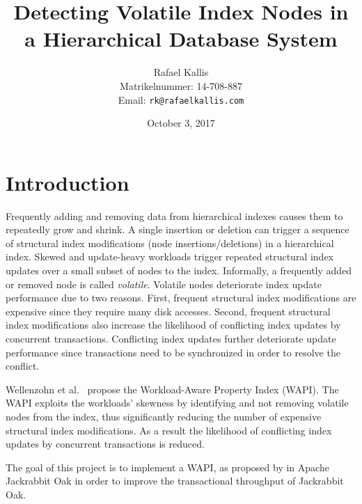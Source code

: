 \documentclass[abstracton,12pt]{scrartcl}
\title{Detecting Volatile Index Nodes in a Hierarchical Database System}
\author{
  Rafael Kallis\\[-5pt]
  \scriptsize Matrikelnummer: 14-708-887\\[-5pt]
  \scriptsize Email: \texttt{rk@rafaelkallis.com}
}
\date{\vspace*{2cm}October 3, 2017}
\theoremstyle{definition}
\begin{document}
\maketitle





\newpage
\section{Introduction}

Frequently adding and removing data from hierarchical indexes causes them to repeatedly grow and shrink.
A single insertion or deletion can trigger a sequence of structural index modifications (node insertions/deletions) in a hierarchical index.
Skewed and update-heavy workloads trigger repeated structural index updates over a small subset of nodes to the index.
Informally, a frequently added or removed node is called \textit{volatile}.
Volatile nodes deteriorate index update performance due to two reasons.
First, frequent structural index modifications are expensive since they require many disk accesses.
Second, frequent structural index modifications also increase the likelihood of conflicting index updates by concurrent transactions.
Conflicting index updates further deteriorate update performance since transactions need to be synchronized in order to resolve the conflict.

Wellenzohn et al.~\cite{KW17} propose the Workload-Aware Property Index (WAPI). 
The WAPI exploits the workloads' skewness by identifying and not removing volatile nodes from the index, 
thus significantly reducing the number of expensive structural index modifications.
As a result the likelihood of conflicting index updates by concurrent transactions is reduced.

The goal of this project is to implement a WAPI, as proposed by \cite{KW17} in Apache Jackrabbit Oak in order to improve the transactional throughput of Jackrabbit Oak.
\end{document}
